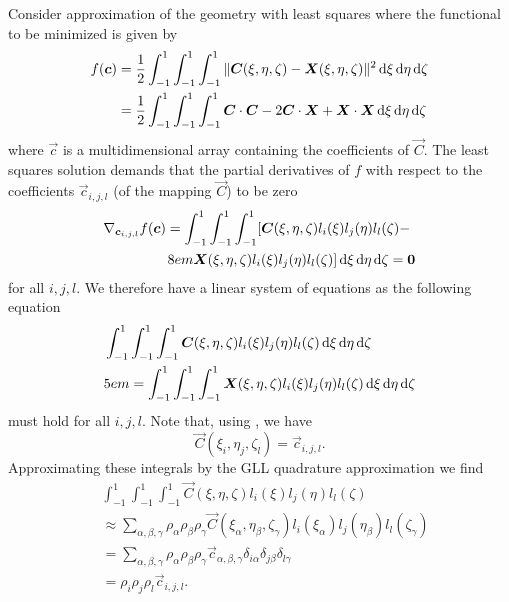 Consider approximation of the geometry with least squares where the functional to be minimized is given by
\begin{align*}
	f(\vec{c}) &= \frac{1}{2}\int_{-1}^1\int_{-1}^1\int_{-1}^1\|\vec{C}(\xi,\eta,\zeta) - \vec{X}(\xi,\eta,\zeta)\|^2\idiff\xi\idiff\eta\idiff\zeta \\
	&= \frac{1}{2}\int_{-1}^1\int_{-1}^1\int_{-1}^1\vec{C}\cdot \vec{C} - 2\vec{C}\cdot\vec{X}+\vec{X}\cdot\vec{X}\idiff\xi\idiff\eta\idiff\zeta
\end{align*}
where $\vec{c}$ is a multidimensional array containing the coefficients of $\vec{C}$. The least squares solution demands that the partial derivatives of $f$ with respect to the coefficients $\vec{c}_{i,j,l}$ (of the mapping $\vec{C}$) to be zero
\begin{align*}
	\nabla_{\vec{c}_{i,j,l}} f(\vec{c}) &= \int_{-1}^1\int_{-1}^1\int_{-1}^1\left[\vec{C}(\xi,\eta,\zeta)l_i(\xi)l_j(\eta)l_l(\zeta) - \right.\\
	&\left.{\hskip8em\relax}\vec{X}(\xi,\eta,\zeta)l_i(\xi)l_j(\eta)l_l(\zeta)\right]\idiff\xi\idiff\eta\idiff\zeta = \zerovec
\end{align*}
for all $i,j,l$. We therefore have a linear system of equations as the following equation
\begin{equation}\label{Eq5:leastSquares}
\begin{aligned}
	&\int_{-1}^1\int_{-1}^1\int_{-1}^1\vec{C}(\xi,\eta,\zeta)l_i(\xi)l_j(\eta)l_l(\zeta)\idiff\xi\idiff\eta\idiff\zeta \\
	&{\hskip5em\relax}= \int_{-1}^1\int_{-1}^1\int_{-1}^1 \vec{X}(\xi,\eta,\zeta)l_i(\xi)l_j(\eta)l_l(\zeta)\idiff\xi\idiff\eta\idiff\zeta
\end{aligned}
\end{equation}
must hold for all $i,j,l$. Note that, using , we have
\begin{equation*}
	\vec{C}(\xi_i,\eta_j,\zeta_l) = \vec{c}_{i,j,l}.
\end{equation*}
Approximating these integrals by the GLL quadrature approximation we find
\begin{align*}
	&\int_{-1}^1\int_{-1}^1\int_{-1}^1\vec{C}(\xi,\eta,\zeta)l_i(\xi)l_j(\eta)l_l(\zeta) \\
	&\approx \sum_{\alpha,\beta,\gamma} \rho_\alpha\rho_\beta\rho_\gamma\vec{C}(\xi_\alpha,\eta_\beta,\zeta_\gamma)l_i(\xi_\alpha)l_j(\eta_\beta)l_l(\zeta_\gamma)\\
	&= \sum_{\alpha,\beta,\gamma} \rho_\alpha\rho_\beta\rho_\gamma\vec{c}_{\alpha,\beta,\gamma}\delta_{i\alpha}\delta_{j\beta}\delta_{l\gamma} \\
	&= \rho_i\rho_j\rho_l\vec{c}_{i,j,l}.
\end{align*}

